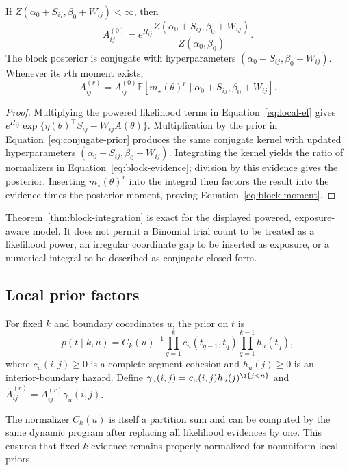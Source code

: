 \begin{theorem}
\label{thm:block-integration}
If $Z(\alpha_0+S_{ij},\beta_0+W_{ij})<\infty$, then
\begin{equation}
 A^{(0)}_{ij}=e^{H_{ij}}
 \frac{Z(\alpha_0+S_{ij},\beta_0+W_{ij})}{Z(\alpha_0,\beta_0)}.
\label{eq:block-evidence}
\end{equation}
The block posterior is conjugate with hyperparameters
$(\alpha_0+S_{ij},\beta_0+W_{ij})$. Whenever its $r$th moment exists,
\begin{equation}
 A^{(r)}_{ij}=A^{(0)}_{ij}
 \mathbb E[m_\star(\theta)^r\mid\alpha_0+S_{ij},\beta_0+W_{ij}].
\label{eq:block-moment}
\end{equation}
\end{theorem}
\begin{proof}
Multiplying the powered likelihood terms in Equation~\eqref{eq:local-ef} gives
$e^{H_{ij}}\exp\{\eta(\theta)^\top S_{ij}-W_{ij}A(\theta)\}$. Multiplication by the prior in Equation~\eqref{eq:conjugate-prior} produces the same conjugate kernel with updated hyperparameters $(\alpha_0+S_{ij},\beta_0+W_{ij})$. Integrating the kernel yields the ratio of normalizers in Equation~\eqref{eq:block-evidence}; division by this evidence gives the posterior. Inserting $m_\star(\theta)^r$ into the integral then factors the result into the evidence times the posterior moment, proving Equation~\eqref{eq:block-moment}.
\end{proof}

\begin{remark}
Theorem~\ref{thm:block-integration} is exact for the displayed powered, exposure-aware model. It does not permit a Binomial trial count to be treated as a likelihood power, an irregular coordinate gap to be inserted as exposure, or a numerical integral to be described as conjugate closed form.
\end{remark}

\subsection{Local prior factors}
\begin{assumption}
\label{ass:factorized-prior}
For fixed $k$ and boundary coordinates $u$, the prior on $t$ is
\begin{equation}
 p(t\mid k,u)=C_k(u)^{-1}
 \prod_{q=1}^{k}c_u(t_{q-1},t_q)
 \prod_{q=1}^{k-1}h_u(t_q),
\label{eq:partition-prior}
\end{equation}
where $c_u(i,j)\ge0$ is a complete-segment cohesion and $h_u(j)\ge0$ is an interior-boundary hazard. Define
$\gamma_u(i,j)=c_u(i,j)h_u(j)^{\1\{j<n\}}$ and
$\widetilde A^{(r)}_{ij}=A^{(r)}_{ij}\gamma_u(i,j)$.
\end{assumption}
The normalizer $C_k(u)$ is itself a partition sum and can be computed by the same dynamic program after replacing all likelihood evidences by one. This ensures that fixed-$k$ evidence remains properly normalized for nonuniform local priors.

